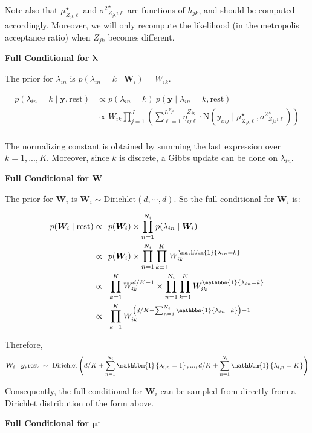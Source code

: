 \documentclass[12pt,]{article}
\newcommand{\p}[1]{\left(#1\right)}
\newcommand{\bc}[1]{ \left\{#1\right\} }
\newcommand{\N}{ \mathcal{N} }
\def\N{\text{N}}
\def\Dir{\text{Dirichlet}}
\def\lin{\lambda_{in}}
\def\y{\bm{y}}
\def\mus{\mu^\star}
\def\sss{{\sigma^2}^\star}
\newcommand{\Ind}[1]{\mathbbm{1}\bc{#1}}
\def\rest{\text{rest}}
\begin{document}

Note also that \(\mus_{Z_{jk}\ell}\) and \(\sss_{Z_{jk}i\ell}\) are
functions of \(h_{jk}\), and should be computed accordingly. Moreover,
we will only recompute the likelihood (in the metropolis acceptance
ratio) when \(Z_{jk}\) becomes different.  
\vspace{2em}


\textbf{Full Conditional for $\bm \lambda$}

The prior for \(\lin\) is \(p(\lin = k \mid \bm W_i) = W_{ik}\).

\begin{align*}
p(\lin=k\mid \y,\rest) &\propto p(\lin=k) ~ p(\y \mid \lin=k, \rest) \\
&\propto W_{ik}
\prod_{j=1}^J 
\p{
  \sum_{\ell=1}^{L^{Z_{jk}}} \eta^{Z_{jk}}_{ij\ell} \cdot
  \N(y_{inj} \mid 
  \mus_{Z_{jk}\ell}, \sss_{Z_{jk}i\ell})
}\\
\end{align*}

The normalizing constant is obtained by summing the last expression over
\(k = 1,...,K\). Moreover, since \(k\) is discrete, a Gibbs update can
be done on \(\lin\).

\textbf{Full Conditional for $\bm W$}

The prior for \(\bm{W}_i\) is \(\bm W_i \sim \Dir(d, \cdots, d)\). So
the full conditional for \(\bm{W}_i\) is:

\begin{align*}
p(\bm W_i \mid \rest) \propto&~~ p(\bm{W}_i) \times \prod_{n=1}^{N_i} p(\lin \mid \bm{W}_i)\\
\propto&~~ p(\bm{W}_i) \times \prod_{n=1}^{N_i}\prod_{k=1}^K W_{ik}^{\Ind{\lin=k}}\\
\propto&~~ \prod_{k=1}^K W_{ik}^{d/K-1} \times \prod_{n=1}^{N_i}\prod_{k=1}^K W_{ik}^{\Ind{\lin=k}}\\
\propto&~~ \prod_{k=1}^K W_{ik}^{\p{d/K + \sum_{n=1}^{N_i}\Ind{\lin=k}}-1}\\
%
\end{align*}

Therefore, \[
\bm{W}_i \mid \y,\rest ~\sim~ \Dir\p{d/K+\sum_{n=1}^{N_i}\Ind{\lambda_{i,n}=1},...,d/K+\sum_{n=1}^{N_i}\Ind{\lambda_{i,n}=K}} 
\]

Consequently, the full conditional for \(\bm{W}_i\) can be sampled from
directly from a Dirichlet distribution of the form above.
\vspace{2em}


\textbf{Full Conditional for $\bm\mu^\star$}
\end{document}
